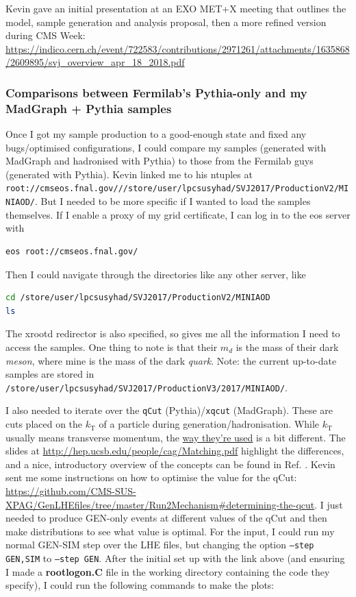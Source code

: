 Kevin gave an initial presentation at an EXO MET+X meeting that outlines the model, sample generation and analysis proposal, then a more refined version during CMS Week: \url{https://indico.cern.ch/event/722583/contributions/2971261/attachments/1635868/2609895/svj_overview_apr_18_2018.pdf}


\subsubsection{Comparisons between Fermilab's Pythia-only and my MadGraph + Pythia samples}

Once I got my sample production to a good-enough state and fixed any bugs/optimised configurations, I could compare my samples (generated with MadGraph and hadronised with Pythia) to those from the Fermilab guys (generated with Pythia). Kevin linked me to his ntuples at \texttt{root://cmseos.fnal.gov///store/user/lpcsusyhad/SVJ2017/ProductionV2/MINIAOD/}. But I needed to be more specific if I wanted to load the samples themselves. If I enable a proxy of my grid certificate, I can log in to the eos server with

\begin{lstlisting}[belowskip=-0.7cm, language=sh, numbers=none]
eos root://cmseos.fnal.gov/
\end{lstlisting}

Then I could navigate through the directories like any other server, like

\begin{lstlisting}[belowskip=-0.7cm, language=sh, numbers=none]
cd /store/user/lpcsusyhad/SVJ2017/ProductionV2/MINIAOD
ls
\end{lstlisting}

The xrootd redirector is also specified, so gives me all the information I need to access the samples. One thing to note is that their $m_d$ is the mass of their dark \emph{meson}, where mine is the mass of the dark \emph{quark}. Note: the current up-to-date samples are stored in \texttt{/store/user/lpcsusyhad/SVJ2017/ProductionV3/2017/MINIAOD/}.

I also needed to iterate over the \texttt{qCut} (Pythia)/\texttt{xqcut} (MadGraph). These are cuts placed on the $k_{\mathrm{T}}$ of a particle during generation/hadronisation. While $k_{\mathrm{T}}$ usually means transverse momentum, the \uline{way they're used} is a bit different. The slides at \url{http://hep.ucsb.edu/people/cag/Matching.pdf} highlight the differences, and a nice, introductory overview of the concepts can be found in Ref. \cite{SalamJetClustering2006}. Kevin sent me some instructions on how to optimise the value for the qCut: \url{https://github.com/CMS-SUS-XPAG/GenLHEfiles/tree/master/Run2Mechanism#determining-the-qcut}. I just needed to produce GEN-only events at different values of the qCut and then make distributions to see what value is optimal. For the input, I could run my normal GEN-SIM step over the LHE files, but changing the option \texttt{--step GEN,SIM} to \texttt{--step GEN}. After the initial set up with the link above (and ensuring I made a \textbf{rootlogon.C} file in the working directory containing the code they specify), I could run the following commands to make the plots:

